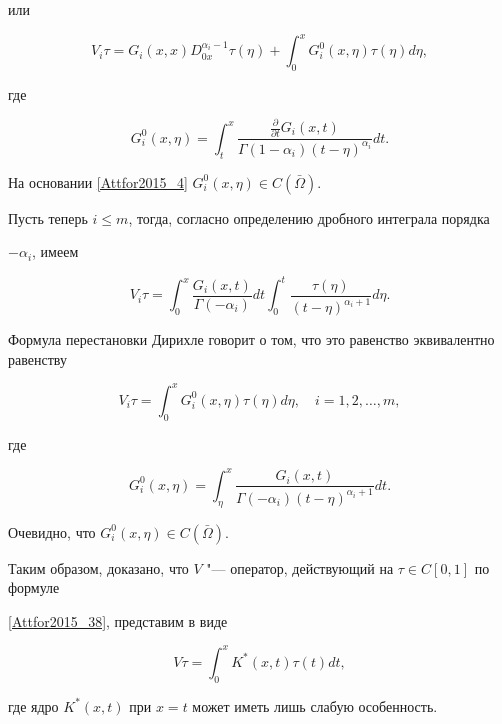 или

$$

V_i \tau=G_i(x,x)D_{0x}^{\alpha_i-1}\tau(\eta)+

 \int _0^x G_i^0(x,\eta)\tau(\eta)d\eta,

$$

где

$$

G_i^0(x,\eta)= \int _t^x 

\frac{\frac{\partial}{\partial t}G_i(x,t)}{\Gamma(1-\alpha_i)(t-\eta)^{\alpha_i}}dt.

$$

На основании \eqref{Attfor2015_4} $G_i^0(x,\eta)\in C(\bar{\Omega})$.



Пусть теперь $i\leqslant m$, тогда, согласно определению дробного интеграла порядка 

$-\alpha_i$, имеем

$$

V_i \tau= \int _0^x \frac{G_i(x,t)}{\Gamma(-\alpha_i)} dt \int _0^t 

\frac{\tau(\eta)}{(t-\eta)^{\alpha_i+1}} d\eta.

$$



Формула перестановки Дирихле говорит о том, что это равенство эквивалентно равенству

$$

V_i \tau= \int _0^x G_i^0(x,\eta)\tau(\eta)d\eta,

\quad i=1 , 2,\ldots,m,

$$

где

$$

G_i^0(x,\eta)= \int _\eta^x 

\frac{G_i(x,t)}{\Gamma(-\alpha_i)(t-\eta)^{\alpha_i+1}}dt.

$$

Очевидно, что $G_i^0(x,\eta)\in C(\bar{\Omega})$.



Таким образом, доказано, что $V$ "--- оператор, действующий на $\tau\in C[0 , 1]$ по формуле 

\eqref{Attfor2015_38}, представим в виде

$$

V \tau= \int _0^x K^*(x,t)\tau(t)dt,

$$

где ядро $K^*(x,t)$ при $x=t$ может иметь лишь слабую особенность.



